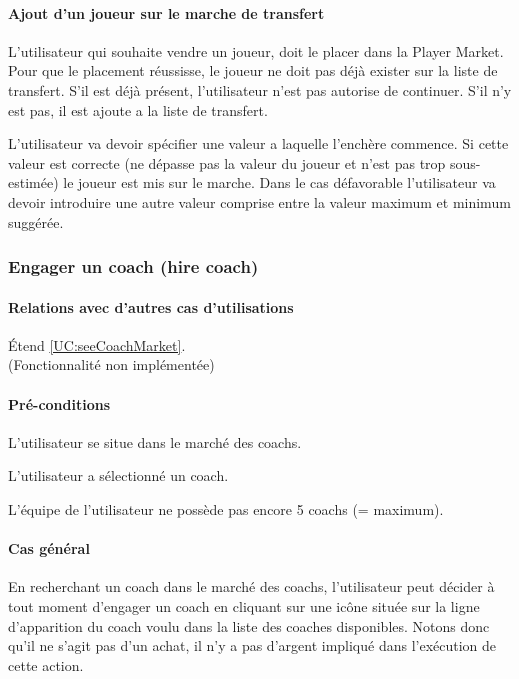 \paragraph{Ajout d'un joueur sur le marche de transfert}
\begin{list}{}{\leftmargin=1.5em}
\item{L'utilisateur qui souhaite vendre un joueur, doit le placer dans la Player Market. Pour que le placement réussisse, le joueur ne doit pas déjà exister sur la liste de transfert. S'il est déjà présent, l'utilisateur n'est pas autorise de continuer. S'il n'y est pas, il est ajoute a la liste de transfert.}
\item{L'utilisateur va devoir spécifier une valeur a laquelle l'enchère commence. Si cette valeur est correcte (ne dépasse pas la valeur du joueur et n'est pas trop sous-estimée) le joueur est mis sur le marche. Dans le cas défavorable l'utilisateur va devoir introduire une autre valeur comprise entre la valeur maximum et minimum suggérée.}
\end{list}

\subsubsection{Engager un coach (hire coach)}
\label{UC:hireCoach}
\paragraph{Relations avec d'autres cas d'utilisations}
Étend \ref{UC:seeCoachMarket}.
\\(Fonctionnalité non implémentée)
\paragraph{Pré-conditions}
\begin{list}{}{\leftmargin=1.5em}
\item{L'utilisateur se situe dans le marché des coachs.}
\item{L'utilisateur a sélectionné un coach.}
\item{L'équipe de l'utilisateur ne possède pas encore 5 coachs (= maximum).}
\end{list}
\paragraph{Cas général}
En recherchant un coach dans le marché des coachs, l'utilisateur peut décider à tout moment d'engager un coach en cliquant sur une icône située sur la ligne d'apparition du coach voulu dans la liste des coaches disponibles. Notons donc qu'il ne s'agit pas d'un achat, il n'y a pas d'argent impliqué dans l'exécution de cette action. 
